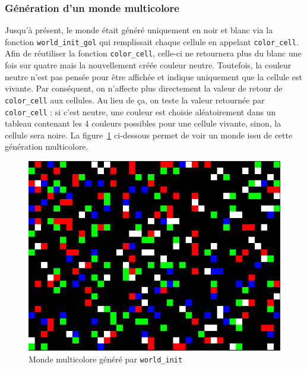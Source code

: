\documentclass[a4paper]{article}
\begin{document}
\subsubsection{Génération d'un monde multicolore}
Jusqu'à présent, le monde était généré uniquement en noir et blanc via la fonction \texttt{world\_init\_gol} qui remplissait chaque cellule en appelant \texttt{color\_cell}. Afin de réutiliser la fonction \texttt{color\_cell}, celle-ci ne retournera plus du blanc une fois sur quatre mais la nouvellement créée couleur neutre. Toutefois, la couleur neutre n'est pas pensée pour être affichée et indique uniquement que la cellule est vivante. Par conséquent, on n'affecte plus directement la valeur de retour de \texttt{color\_cell} aux cellules. Au lieu de ça, on teste la valeur retournée par \texttt{color\_cell} : si c'est neutre, une couleur est choisie aléatoirement dans un tableau contenant les 4 couleurs possibles pour une cellule vivante, sinon, la cellule sera noire.
La figure~\ref{fig:world_col} ci-dessous permet de voir un monde issu de cette génération multicolore.

\begin{figure}[htb]
    \centering
    \includegraphics[scale=0.25]{img/monde_couleur.png}
    \caption{Monde multicolore généré par \texttt{world\_init}}
    \label{fig:world_col}
\end{figure}
\end{document}
